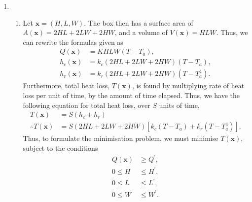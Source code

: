 \documentclass[a4paper,11pt]{article}
\newcommand{\ds}{\displaystyle}
\begin{document}
{{\begin{enumerate}[leftmargin=*]
		\item \begin{enumerate}[label=\alph*)]
			\item Let $\ds{\mathbf{x} = (H,L,W)}$. The box then has a surface area of $\ds{A(\mathbf{x}) = 2HL + 2LW + 2HW}$, and a volume of $\ds{V(\mathbf{x}) = HLW}$. Thus, we can rewrite the formulas given as
				\begin{align*}
					Q(\mathbf{x}) & = KHLW(T-T_a), \\
					h_c(\mathbf{x}) & = k_c(2HL + 2LW + 2HW)(T-T_a), \\
					h_r(\mathbf{x}) & = k_r(2HL + 2LW + 2HW)(T-T_a^4). 
				\end{align*}
				Furthermore, total heat loss, $\ds{T(\mathbf{x})}$, is found by multiplying rate of heat loss per unit of time, by the amount of time elapsed. Thus, we have the following equation for total heat loss, over $\ds{S}$ units of time,
				\begin{align*}
					T(\mathbf{x}) & = S(h_c + h_r) \\
					\therefore T(\mathbf{x}) & = S(2HL + 2LW + 2HW) \left[k_c(T-T_a) + k_r(T-T_a^4)\right].
				\end{align*}
				Thus, to formulate the minimisation problem, we must minimise $\ds{T(\mathbf{x})}$, subject to the conditions 
				\begin{align*}
					Q(\mathbf{x}) & \geq Q^{\prime}, \\
					0 \leq H & \leq H^{\prime}, \\
					0 \leq L & \leq L^{\prime}, \\
					0 \leq W & \leq W^{\prime}.
				\end{align*}


\end{enumerate}
\end{enumerate}}}
\end{document}
